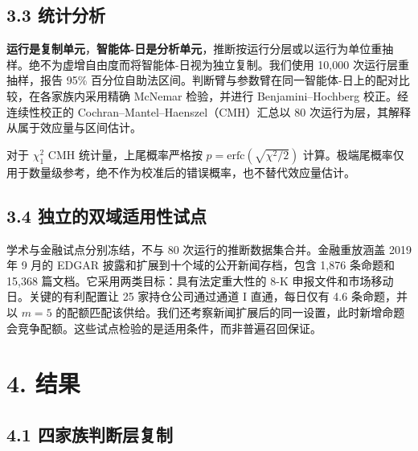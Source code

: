 \documentclass[
  chinese,
  conference,10pt]{IEEEtran}
\begin{document}
\subsection{3.3 统计分析}\label{ux7edfux8ba1ux5206ux6790}

\textbf{运行是复制单元}，\textbf{智能体-日是分析单元}，推断按运行分层或以运行为单位重抽样。绝不为虚增自由度而将智能体-日视为独立复制。我们使用 10,000 次运行层重抽样，报告 95\% 百分位自助法区间。判断臂与参数臂在同一智能体-日上的配对比较，在各家族内采用精确 McNemar 检验，并进行 Benjamini--Hochberg 校正。经连续性校正的 Cochran--Mantel--Haenszel（CMH）汇总以 80 次运行为层，其解释从属于效应量与区间估计。

对于 \(\chi^2_1\) CMH 统计量，上尾概率严格按 \(p=\mathrm{erfc}(\sqrt{\chi^2/2})\) 计算。极端尾概率仅用于数量级参考，绝不作为校准后的错误概率，也不替代效应量估计。

\subsection{3.4 独立的双域适用性试点}\label{ux72ecux7acbux7684ux53ccux57dfux9002ux7528ux6027ux8bd5ux70b9}

学术与金融试点分别冻结，不与 80 次运行的推断数据集合并。金融重放涵盖 2019 年 9 月的 EDGAR 披露和扩展到十个域的公开新闻存档，包含 1,876 条命题和 15,368 篇文档。它采用两类目标：具有法定重大性的 8-K 申报文件和市场移动日。关键的有利配置让 25 家持仓公司通过通道 I 直通，每日仅有 4.6 条命题，并以 \(m=5\) 的配额匹配该供给。我们还考察新闻扩展后的同一设置，此时新增命题会竞争配额。这些试点检验的是适用条件，而非普遍召回保证。

\section{4. 结果}\label{ux7ed3ux679c}

\subsection{4.1 四家族判断层复制}\label{ux56dbux5bb6ux65cfux5224ux65adux5c42ux590dux5236}

\begin{table}[t]
\centering
\footnotesize
\setlength{\tabcolsep}{3pt}
\caption{表 1. 冻结的四家族机制性结果。召回区间为运行层自助法 95\% 置信区间；\(\Delta\)value 为描述性指标。}
\end{table}
\end{document}
